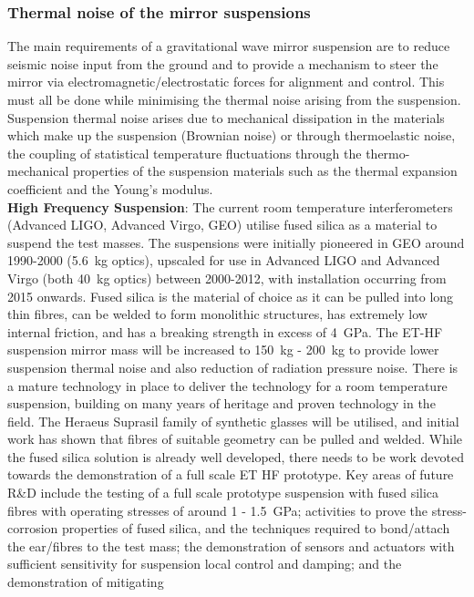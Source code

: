 \subsubsection{Thermal noise of the mirror suspensions}
The main requirements of a gravitational wave mirror suspension are to reduce seismic noise input from the ground and to provide a mechanism to steer the mirror via electromagnetic/electrostatic forces for alignment and control. This must all be done while minimising the thermal noise arising from the suspension. Suspension thermal noise arises due to mechanical dissipation in the materials which make up the suspension (Brownian noise) or through thermoelastic noise, the coupling of statistical temperature fluctuations through the thermo-mechanical properties of the suspension materials such as the thermal expansion coefficient and the Young's modulus. \\
{\bfseries High Frequency Suspension}: The current room temperature
interferometers (Advanced LIGO, Advanced Virgo, GEO) utilise fused silica as a material to
suspend the test masses. The suspensions were initially pioneered in GEO
around 1990-2000 (5.6~kg optics),  upscaled for use in Advanced LIGO and Advanced Virgo (both
40~kg optics) between 2000-2012, with installation occurring from 2015 onwards.
Fused silica is the material of choice as it can be pulled into long thin
fibres, can be welded to form monolithic structures, has extremely low internal
friction,  and has a breaking strength in excess of 4~GPa. The ET-HF
suspension mirror mass will be increased to 150~kg - 200~kg to provide lower
suspension thermal noise and also reduction of radiation pressure noise. There
is a mature technology in place to deliver the technology for a room temperature suspension, building on many years of heritage and proven technology in the field. The Heraeus Suprasil family of synthetic glasses will be utilised, and initial work has shown that fibres of suitable geometry can be pulled and
welded. While the fused silica solution is already well developed, there needs to
be work devoted towards the demonstration of a full scale ET HF prototype. Key
areas of future R\&D include
the testing of a full scale prototype suspension with fused silica fibres with
operating stresses of around 1 - 1.5~GPa;
activities to prove the stress-corrosion properties of fused silica, and the
techniques required to bond/attach the ear/fibres to the test mass; the
demonstration of sensors and actuators with sufficient sensitivity 
for suspension local control and damping; and the demonstration of mitigating
